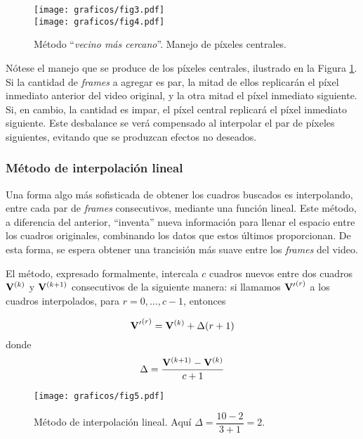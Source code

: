         \begin{figure}[h]
          \centering

          \texttt{[image: graficos/fig3.pdf]} \vspace{2em} \\
          \texttt{[image: graficos/fig4.pdf]} \vspace{1em} \\

          \caption{Método ``\emph{vecino más cercano}''. Manejo de píxeles centrales.}
          \label{fig:vecino}
        \end{figure}

        Nótese el manejo que se produce de los píxeles centrales, ilustrado en la Figura \ref{fig:vecino}. Si la cantidad de \emph{frames} a agregar es par, la mitad de ellos replicarán el píxel inmediato anterior del video original, y la otra mitad el píxel inmediato siguiente. Si, en cambio, la cantidad es impar, el píxel central replicará el píxel inmediato siguiente. Este desbalance se verá compensado al interpolar el par de píxeles siguientes, evitando que se produzcan efectos no deseados.

      \subsubsection{Método de interpolación lineal}
        Una forma algo más sofisticada de obtener los cuadros buscados es interpolando, entre cada par de \emph{frames} consecutivos, mediante una función lineal. Este método, a diferencia del anterior, ``inventa'' nueva información para llenar el espacio entre los cuadros originales, combinando los datos que estos últimos proporcionan. De esta forma, se espera obtener una trancisión más suave entre los \emph{frames} del video.

        El método, expresado formalmente, intercala $c$ cuadros nuevos entre dos cuadros $\mathbf{V}^{(k)}$ y $\mathbf{V}^{(k+1)}$ consecutivos de la siguiente manera: si llamamos $\mathbf{V'}^{(r)}$ a los cuadros interpolados, para $r = 0, \dots, c - 1$, entonces

        \[ \mathbf{V'}^{(r)} = \mathbf{V}^{(k)} + \Delta (r + 1) \]
        donde
        \[ \Delta = \frac{\mathbf{V}^{(k+1)} - \mathbf{V}^{(k)}}{c + 1} \]

        \begin{figure}[h]
          \centering

          \texttt{[image: graficos/fig5.pdf]} \vspace{1em} \\

          \caption{Método de interpolación lineal. Aquí $\Delta = \dfrac{10 - 2}{3 + 1} = 2$.}
          \label{fig:lineal}
        \end{figure}

